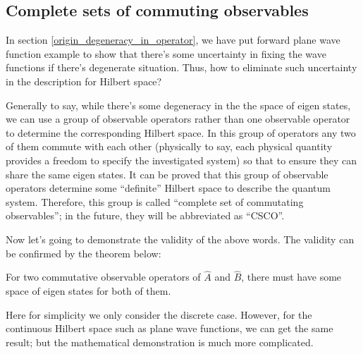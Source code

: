 \subsection{Complete sets of commuting observables}
\label{CSCO_in_operator}
%
%
In section \ref{origin_degeneracy_in_operator}, we have put forward
plane wave function example to show that there's some uncertainty in
fixing the wave functions if there's degenerate situation. Thus, how
to eliminate such uncertainty in the description for Hilbert space?

Generally to say, while there's some degeneracy in the the space of
eigen states, we can use a group of observable operators rather than
one observable operator to determine the corresponding Hilbert
space. In this group of operators any two of them commute with each
other (physically to say, each physical quantity provides a freedom
to specify the investigated system) so that to ensure they can share
the same eigen states. It can be proved that this group of
observable operators determine some ``definite'' Hilbert space to
describe the quantum system. Therefore, this group is called
``complete set of commutating observables''; in the future, they
will be abbreviated as ``CSCO''.

Now let's going to demonstrate the validity of the above words. The
validity can be confirmed by the theorem below:

\begin{theorem}
For two commutative observable operators of $\hat{A}$ and $\hat{B}$,
there must have some space of eigen states for both of them.
\end{theorem}

Here for simplicity we only consider the discrete case. However, for
the continuous Hilbert space such as plane wave functions, we can
get the same result; but the mathematical demonstration is much more
complicated.

